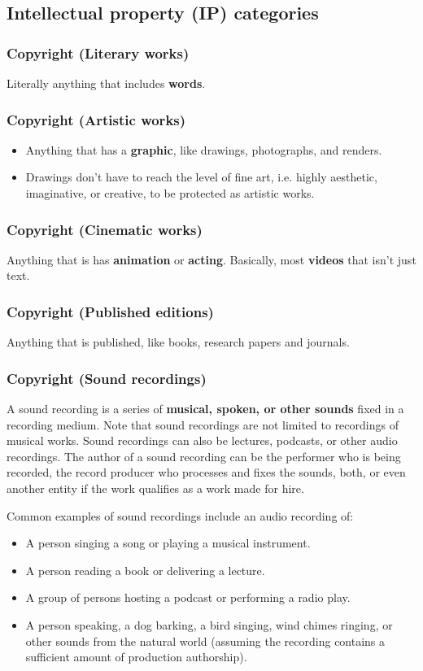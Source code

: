 \documentclass[11pt]{article}
\begin{document}
\clearpage
\subsection{Intellectual property (IP) categories}
\label{sec:org8c3d00b}

\subsubsection{Copyright (Literary works)}
\label{sec:orga7cba88}
Literally anything that includes \textbf{words}.
\subsubsection{Copyright (Artistic works)}
\label{sec:orga67db31}
\begin{itemize}
\item Anything that has a \textbf{graphic}, like drawings, photographs, and renders.
\item Drawings don't have to reach the level of fine art, i.e. highly aesthetic, imaginative, or creative, to be protected as artistic works.
\end{itemize}
\subsubsection{Copyright (Cinematic works)}
\label{sec:orge1f75cb}
Anything that is has \textbf{animation} or \textbf{acting}. Basically, most \textbf{videos} that isn't just text.
\subsubsection{Copyright (Published editions)}
\label{sec:org589c1f6}
Anything that is published, like books, research papers and journals.
\subsubsection{Copyright (Sound recordings)}
\label{sec:org6b37420}
A sound recording is a series of \textbf{musical, spoken, or other sounds} fixed in a recording medium. Note that sound recordings are not limited to recordings of musical works. Sound recordings can also be lectures, podcasts, or other audio recordings. The author of a sound recording can be the performer who is being recorded, the record producer who processes and fixes the sounds, both, or even another entity if the work qualifies as a work made for hire.

Common examples of sound recordings include an audio recording of:
\begin{itemize}
\item A person singing a song or playing a musical instrument.
\item A person reading a book or delivering a lecture.
\item A group of persons hosting a podcast or performing a radio play.
\item A person speaking, a dog barking, a bird singing, wind chimes ringing, or other sounds from the natural world (assuming the recording contains a sufficient amount of production authorship).
\end{itemize}
\end{document}
